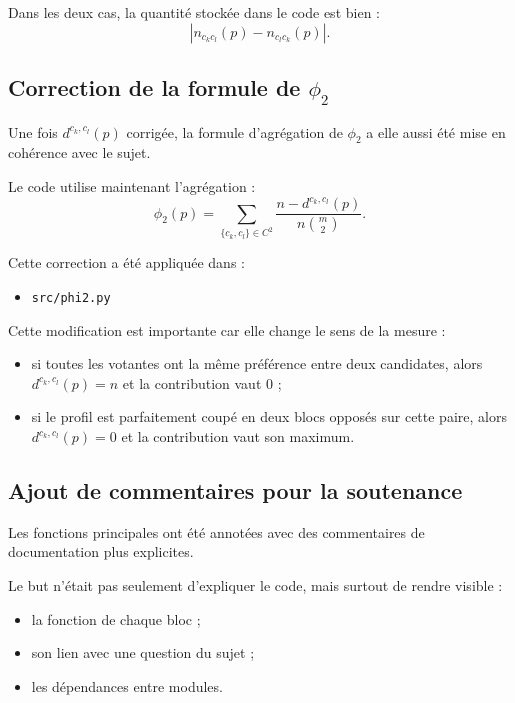 \documentclass[11pt,a4paper]{article}
\begin{document}
Dans les deux cas, la quantit\'e stock\'ee dans le code est bien :
\[
\left|n_{c_kc_l}(p)-n_{c_lc_k}(p)\right|.
\]

\subsection{Correction de la formule de \texorpdfstring{$\phi_2$}{phi2}}

Une fois \(d^{c_k,c_l}(p)\) corrig\'ee, la formule d'agr\'egation de \(\phi_2\) a elle aussi \'et\'e mise en coh\'erence avec le sujet.

Le code utilise maintenant l'agr\'egation :
\[
\phi_2(p)=\sum_{\{c_k,c_l\}\in C^2}\frac{n-d^{c_k,c_l}(p)}{n\binom{m}{2}}.
\]

Cette correction a \'et\'e appliqu\'ee dans :
\begin{itemize}[leftmargin=*]
    \item \texttt{src/phi2.py}
\end{itemize}

Cette modification est importante car elle change le sens de la mesure :
\begin{itemize}[leftmargin=*]
    \item si toutes les votantes ont la m\^eme pr\'ef\'erence entre deux candidates, alors \(d^{c_k,c_l}(p)=n\) et la contribution vaut \(0\) ;
    \item si le profil est parfaitement coup\'e en deux blocs oppos\'es sur cette paire, alors \(d^{c_k,c_l}(p)=0\) et la contribution vaut son maximum.
\end{itemize}

\subsection{Ajout de commentaires pour la soutenance}

Les fonctions principales ont \'et\'e annot\'ees avec des commentaires de documentation plus explicites.

Le but n'\'etait pas seulement d'expliquer le code, mais surtout de rendre visible :
\begin{itemize}[leftmargin=*]
    \item la fonction de chaque bloc ;
    \item son lien avec une question du sujet ;
    \item les d\'ependances entre modules.
\end{itemize}
\end{document}
